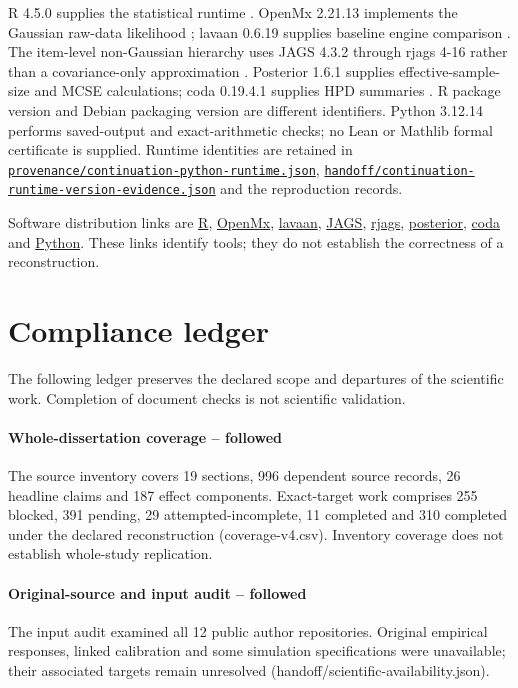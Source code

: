 \documentclass[11pt]{article}
\newcommand{\file}[1]{\href{https://github.com/alectionary/vibe-math/blob/master/formalization/schwabe-psychometric-genetics/#1}{\nolinkurl{#1}}}
\begin{document}
R 4.5.0 supplies the statistical runtime \citep{r2025}. OpenMx 2.21.13 implements the Gaussian raw-data likelihood \citep{neale2016}; lavaan 0.6.19 supplies baseline engine comparison \citep{rosseel2012}. The item-level non-Gaussian hierarchy uses JAGS 4.3.2 through rjags 4-16 rather than a covariance-only approximation \citep{rjags2024}. Posterior 1.6.1 supplies effective-sample-size and MCSE calculations; coda 0.19.4.1 supplies HPD summaries \citep{coda2006}. R package version and Debian packaging version are different identifiers. Python 3.12.14 performs saved-output and exact-arithmetic checks; no Lean or Mathlib formal certificate is supplied. Runtime identities are retained in \file{provenance/continuation-python-runtime.json}, \file{handoff/continuation-runtime-version-evidence.json} and the reproduction records.

Software distribution links are \href{https://www.r-project.org/}{R}, \href{https://CRAN.R-project.org/package=OpenMx}{OpenMx}, \href{https://CRAN.R-project.org/package=lavaan}{lavaan}, \href{https://mcmc-jags.sourceforge.io/}{JAGS}, \href{https://CRAN.R-project.org/package=rjags}{rjags}, \href{https://CRAN.R-project.org/package=posterior}{posterior}, \href{https://CRAN.R-project.org/package=coda}{coda} and \href{https://www.python.org/}{Python}. These links identify tools; they do not establish the correctness of a reconstruction.

\section{Compliance ledger}\label{sec:compliance}
The following ledger preserves the declared scope and departures of the scientific work. Completion of document checks is not scientific validation.
\paragraph{Whole-dissertation coverage -- followed}  The source inventory covers 19 sections, 996 dependent source records, 26 headline claims and 187 effect components. Exact-target work comprises 255 blocked, 391 pending, 29 attempted-incomplete, 11 completed and 310 completed under the declared reconstruction (coverage-v4.csv). Inventory coverage does not establish whole-study replication.
\paragraph{Original-source and input audit -- followed}  The input audit examined all 12 public author repositories. Original empirical responses, linked calibration and some simulation specifications were unavailable; their associated targets remain unresolved (handoff/scientific-availability.json).
\end{document}
